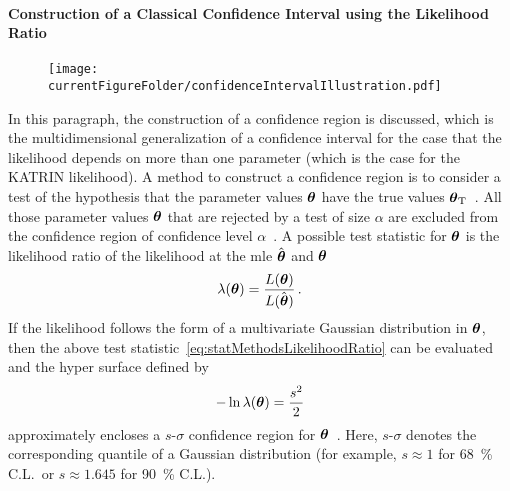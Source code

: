 \paragraph{Construction of a Classical Confidence Interval using the Likelihood Ratio}
\begin{figure}
	\centering
	\texttt{[image: \\currentFigureFolder/confidenceIntervalIllustration.pdf]}
	\label{fig:statMethodsConfidenceContour}
\end{figure}
In this paragraph, the construction of a confidence region is discussed, which is the multidimensional generalization of a confidence interval for the case that the likelihood depends on more than one parameter (which is the case for the KATRIN likelihood). A method to construct a confidence region is to consider a test of the hypothesis that the parameter values $\boldsymbol{\mathbf{\theta}}$ have the true values $\boldsymbol{\mathbf{\theta}}_\mathrm{T}$~\cite{ReviewOfParticlePhysics}. All those parameter values $\boldsymbol{\mathbf{\theta}}$ that are rejected by a test of size $\alpha$ are excluded from the confidence region of confidence level $\alpha$~\cite{ReviewOfParticlePhysics}. A possible test statistic for $\boldsymbol{\mathbf{\theta}}$ is the likelihood ratio of the likelihood at the \gls{mle} $\hat{\boldsymbol{\mathbf{\theta}}}$ and $\boldsymbol{\mathbf{\theta}}$~\cite{ReviewOfParticlePhysics}
\begin{equation}
	\label{eq:statMethodsLikelihoodRatio}
	\lambda(\boldsymbol{\mathbf{\theta}}) =
	\frac{L(\boldsymbol{\mathbf{\theta}})}{L(\hat{\boldsymbol{\mathbf{\theta}}})}
	\text{\,.}
\end{equation}
If the likelihood follows the form of a multivariate Gaussian distribution in $\boldsymbol{\mathbf{\theta}}$, then the above test statistic~\eqref{eq:statMethodsLikelihoodRatio} can be evaluated and the hyper surface defined by
\begin{equation}
	\label{eq:statMethodsConfidenceContour}
	-\ln \lambda(\boldsymbol{\mathbf{\theta}}) = \frac{s^2}{2}
\end{equation}
approximately encloses a $s$-$\sigma$ confidence region for $\boldsymbol{\mathbf{\theta}}$~\cite{ReviewOfParticlePhysics}. Here, $s$-$\sigma$ denotes the corresponding quantile of a Gaussian distribution (for example, $s\approx1$ for \SI{68}{\percent} C.L.~or $s\approx1.645$ for \SI{90}{\percent} C.L.). 

